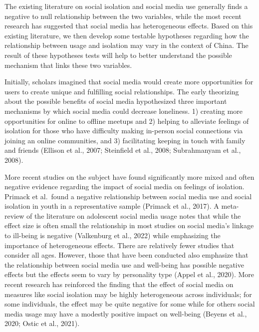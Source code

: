 \documentclass[]{interact}
\theoremstyle{plain}%
\theoremstyle{definition}
\theoremstyle{remark}
\begin{document}
The existing literature on social isolation and social media use
generally finds a negative to null relationship between the two
variables, while the most recent research has suggested that social
media has heterogeneous effects. Based on this existing literature, we
then develop some testable hypotheses regarding how the relationship
between usage and isolation may vary in the context of China. The result
of these hypotheses tests will help to better understand the possible
mechanism that links these two variables.

Initially, scholars imagined that social media would create more
opportunities for users to create unique and fulfilling social
relationships. The early theorizing about the possible benefits of
social media hypothesized three important mechanisms by which social
media could decrease loneliness. 1) creating more opportunities for
online to offline meetups and 2) helping to alleviate feelings of
isolation for those who have difficulty making in-person social
connections via joining an online communities, and 3) facilitating
keeping in touch with family and friends (Ellison et al., 2007;
Steinfield et al., 2008; Subrahmanyam et al., 2008).

More recent studies on the subject have found significantly more mixed
and often negative evidence regarding the impact of social media on
feelings of isolation. Primack et al.~found a negative relationship
between social media use and social isolation in youth in a
representative sample (Primack et al., 2017). A meta-review of the
literature on adolescent social media usage notes that while the effect
size is often small the relationship in most studies on social media's
linkage to ill-being is negative (Valkenburg et al., 2022) while
emphasizing the importance of heterogeneous effects. There are
relatively fewer studies that consider all ages. However, those that
have been conducted also emphasize that the relationship between social
media use and well-being has possible negative effects but the effects
seem to vary by personality type (Appel et al., 2020). More recent
research has reinforced the finding that the effect of social media on
measures like social isolation may be highly heterogeneous across
individuals; for some individuals, the effect may be quite negative for
some while for others social media usage may have a modestly positive
impact on well-being (Beyens et al., 2020; Ostic et al., 2021).
\end{document}
